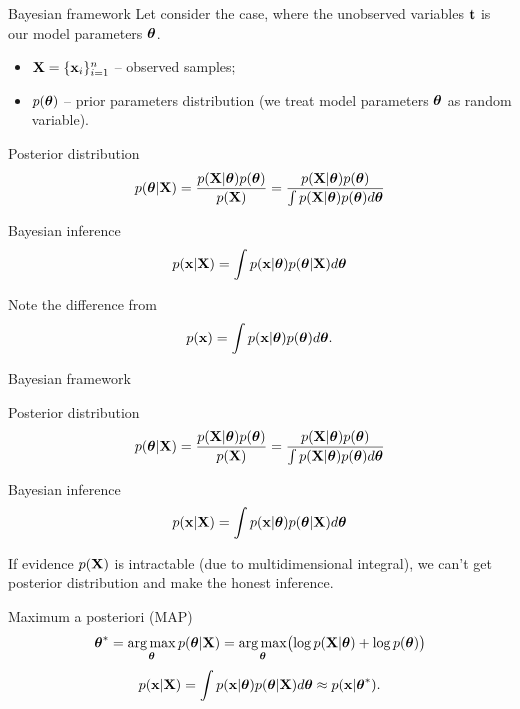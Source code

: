 \begin{frame}{Bayesian framework}
	Let consider the case, where the unobserved variables $\mathbf{t}$ is our model parameters $\boldsymbol{\theta}$.
	\begin{itemize}
		\item $\mathbf{X} = \{\mathbf{x}_i\}_{i=1}^n$ -- observed samples;
		\item $p(\boldsymbol{\theta})$ -- prior parameters distribution (we treat model parameters $\boldsymbol{\theta}$ as random variable).
	\end{itemize}
	\begin{block}{Posterior distribution}
		\[
			p(\boldsymbol{\theta} | \mathbf{X}) = \frac{p(\mathbf{X} | \boldsymbol{\theta}) p(\boldsymbol{\theta})}{p(\mathbf{X})} = \frac{p(\mathbf{X} | \boldsymbol{\theta}) p(\boldsymbol{\theta})}{\int p(\mathbf{X} | \boldsymbol{\theta}) p(\boldsymbol{\theta}) d \boldsymbol{\theta}} 
		\]
		\vspace{-0.2cm}
	\end{block}
	\begin{block}{Bayesian inference}
		\vspace{-0.2cm}
		\[
			p(\mathbf{x} | \mathbf{X}) = \int p(\mathbf{x} | \boldsymbol{\theta}) p(\boldsymbol{\theta} | \mathbf{X}) d \boldsymbol{\theta}
		\]
	\end{block}
 	Note the difference from
	 	\[
	 		p(\mathbf{x}) = \int p(\mathbf{x} | \boldsymbol{\theta}) p(\boldsymbol{\theta}) d \boldsymbol{\theta}.
	 	\]
\end{frame}
\begin{frame}{Bayesian framework}
	\begin{block}{Posterior distribution}
		\[
		p(\boldsymbol{\theta} | \mathbf{X}) = \frac{p(\mathbf{X} | \boldsymbol{\theta}) p(\boldsymbol{\theta})}{p(\mathbf{X})} = \frac{p(\mathbf{X} | \boldsymbol{\theta}) p(\boldsymbol{\theta})}{\int p(\mathbf{X} | \boldsymbol{\theta}) p(\boldsymbol{\theta}) d \boldsymbol{\theta}} 
		\]
		\vspace{-0.2cm}
	\end{block}
	\begin{block}{Bayesian inference}
		\vspace{-0.2cm}
		\[
		p(\mathbf{x} | \mathbf{X}) = \int p(\mathbf{x} | \boldsymbol{\theta}) p(\boldsymbol{\theta} | \mathbf{X}) d \boldsymbol{\theta}
		\]
	\end{block}
	If evidence $p(\mathbf{X})$ is intractable (due to multidimensional integral), we can't get posterior distribution and make the honest inference.
    \begin{block}{Maximum a posteriori (MAP)}
    \vspace{-0.2cm}
    \[
        \boldsymbol{\theta}^* = \operatorname*{arg\,max}_{\boldsymbol{\theta}} p(\boldsymbol{\theta} | \mathbf{X}) = \operatorname*{arg\,max}_{\boldsymbol{\theta}} \bigl(\log p(\mathbf{X} | \boldsymbol{\theta}) + \log p(\boldsymbol{\theta}) \bigr)
    \]
    \vspace{-0.2cm}
    \[
    p(\mathbf{x} | \mathbf{X}) = \int p(\mathbf{x}| \boldsymbol{\theta}) p(\boldsymbol{\theta} | \mathbf{X} ) d \boldsymbol{\theta} \approx p(\mathbf{x} | \boldsymbol{\theta}^*).
    \]
    \end{block}
\end{frame}
